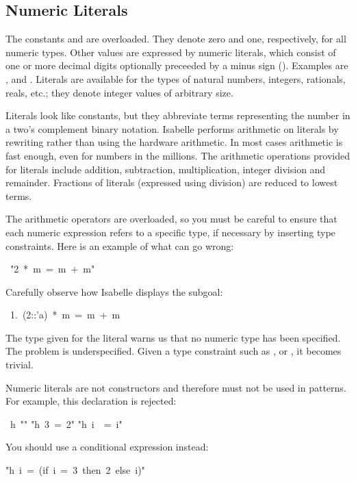 \subsection{Numeric Literals}
\label{sec:numerals}

%
The constants  and  are overloaded.  They denote zero and one,
respectively, for all numeric types.  Other values are expressed by numeric
literals, which consist of one or more decimal digits optionally preceeded by a minus sign (\isa{-}).  Examples are ,  and
.  Literals are available for the types of natural
numbers, integers, rationals, reals, etc.; they denote integer values of
arbitrary size.

Literals look like constants, but they abbreviate 
terms representing the number in a two's complement binary notation. 
Isabelle performs arithmetic on literals by rewriting rather 
than using the hardware arithmetic. In most cases arithmetic 
is fast enough, even for numbers in the millions. The arithmetic operations 
provided for literals include addition, subtraction, multiplication, 
integer division and remainder.  Fractions of literals (expressed using
division) are reduced to lowest terms.

\begin{warn}
The arithmetic operators are 
overloaded, so you must be careful to ensure that each numeric 
expression refers to a specific type, if necessary by inserting 
type constraints.  Here is an example of what can go wrong:
\par
\begin{isabelle}
\ "2\ *\ m\ =\ m\ +\ m"
\end{isabelle}
%
Carefully observe how Isabelle displays the subgoal:
\begin{isabelle}
\ 1.\ (2::'a)\ *\ m\ =\ m\ +\ m
\end{isabelle}
The type  given for the literal  warns us that no numeric
type has been specified.  The problem is underspecified.  Given a type
constraint such as ,  or , it becomes trivial.
\end{warn}

\begin{warn}
Numeric literals are not constructors and therefore
must not be used in patterns.  For example, this declaration is
rejected:
\begin{isabelle}
\ h\ "\isacharbraceleft \isacharbraceright "\isanewline
"h\ 3\ =\ 2"\isanewline
"h\ i\ \ =\ i"
\end{isabelle}

You should use a conditional expression instead:
\begin{isabelle}
"h\ i\ =\ (if\ i\ =\ 3\ then\ 2\ else\ i)"
\end{isabelle}
\end{warn}


